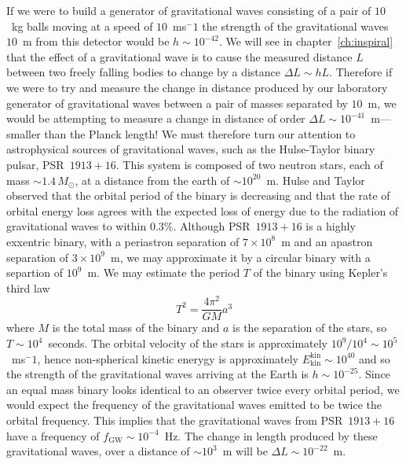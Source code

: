 If we were to build a generator of gravitational waves consisting of a pair of
$10$~kg balls moving at a speed of $10$~ms$^-1$ the strength of the
gravitational waves $10$~m from this detector would be $h \sim 10^{-42}$.  We
will see in chapter~\ref{ch:inspiral} that the effect of a gravitational wave
is to cause the measured distance $L$ between two freely falling bodies to
change by a distance $\Delta L \sim h L$. Therefore if we were to try and
measure the change in distance produced by our laboratory generator of
gravitational waves between a pair of masses separated by $10$~m, we would be
attempting to measure a change in distance of order $\Delta L \sim
10^{-41}$~m---smaller than the Planck length!  We must therefore turn our
attention to astrophysical sources of gravitational waves, such as the
Hulse-Taylor binary pulsar, PSR~$1913+16$\cite{1975ApJ...195L..51H}. This
system is composed of two neutron stars, each of mass $\sim 1.4\,M_\odot$,
at a distance from the earth of $\sim 10^{20}$~m. Hulse and Taylor observed
that the orbital period of the binary is decreasing and that the rate of
orbital energy loss agrees with the expected loss of energy due to the
radiation of gravitational waves to within
$0.3\%$\cite{Taylor:1982,Taylor:1989}. Although PSR~$1913+16$ is a highly
exxentric binary, with a periastron separation of $7\times10^{8}$~m and an
apastron separation of $3\times10^{9}$~m, we may approximate it by a circular
binary with a separtion of $10^{9}$~m. We may estimate the period $T$ of the
binary using Kepler's third law
\begin{equation}
T^2 = \frac{4\pi^2}{GM}a^3
\end{equation}
where $M$ is the total mass of the binary and $a$ is the separation of the
stars, so $T\sim 10^4$~seconds. The orbital velocity of the stars is
approximately $10^9 / 10^4 \sim 10^5$~ms$^-1$, hence non-spherical kinetic
enerygy is approximately $E^\mathrm{kin}_\mathrm{kin} \sim 10^{40}$ and so the
strength of the gravitational waves arriving at the Earth is $h \sim
10^{-25}$. Since an equal mass binary looks identical to an observer twice
every orbital period, we would expect the frequency of the gravitational waves
emitted to be twice the orbital frequency. This implies that the gravitational
waves from PSR~$1913+16$ have a frequency of $f_\mathrm{GW} \sim 10^{-4}$~Hz.
The change in length produced by these gravitational waves, over a distance of
$\sim 10^3$~m will be $\Delta L \sim 10^{-22}$~m.

